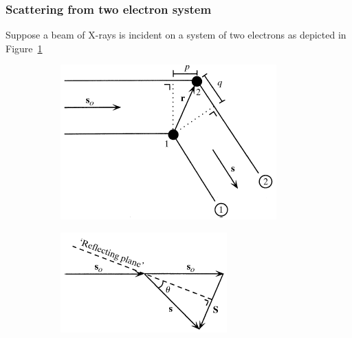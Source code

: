         \subsubsection{Scattering from two electron system}
        \label{subs:Scattering from two electron system}
            Suppose a beam of X-rays is incident on a system of two electrons as depicted in Figure~\ref{fig:Two electron system}
            \begin{figure}
                \centering
                \begin{subfigure}[b]{0.45\textwidth}
                        \centering
                        \includegraphics[width=\textwidth]{figures/introduction/twoelectronsystem.png}
                        \caption{}
                        \label{fig:Two electron system}
                \end{subfigure}
                \qquad
                \begin{subfigure}[b]{0.45\textwidth}
                        \centering
                        \includegraphics[width=\textwidth]{figures/introduction/scatteringvector.png}

\end{subfigure}
\end{figure}
